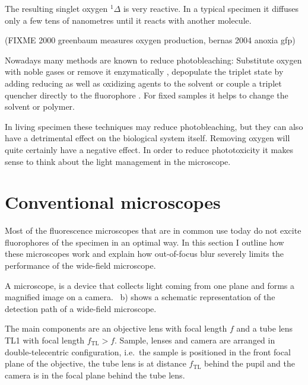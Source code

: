 The resulting singlet oxygen ${}^1\Delta$ is very reactive. In a
typical specimen it diffuses only a few tens of nanometres until it
reacts with another molecule.

(FIXME 2000 greenbaum measures oxygen production, bernas 2004 anoxia gfp)

Nowadays many methods are known to reduce photobleaching: Substitute
oxygen with noble gases or remove it enzymatically
\citep[p.~89]{Sauer2011}, depopulate the triplet state by adding
reducing as well as oxidizing agents to the solvent
\citep{Vogelsang2008} or couple a triplet quencher directly to the
fluorophore \citep[p.~19]{Sauer2011}. For fixed samples it helps to
change the solvent or polymer.
 
In living specimen these techniques may reduce photobleaching, but
they can also have a detrimental effect on the biological system
itself. Removing oxygen will quite certainly have a negative
effect. In order to reduce phototoxicity it makes sense to think about
the light management in the microscope.


\section{Conventional microscopes}
\begin{summary}
  Most of the fluorescence microscopes that are in common use today do
  not excite fluorophores of the specimen in an optimal way. In
  this section I outline how these microscopes work and explain how
  out-of-focus blur severely limits the performance of the wide-field
  microscope.
\end{summary}


A microscope, is a device that collects light coming from one plane
and forms a magnified image on a
camera. ~b) shows a schematic
representation of the detection path of a wide-field microscope.

The main components are an objective lens with focal length $f$ and a
tube lens TL1 with focal length $f_\textrm{TL}>f$. Sample, lenses and
camera are arranged in double-telecentric configuration, i.e.\ the
sample is positioned in the front focal plane of the objective, the
tube lens is at distance $f_\textrm{TL}$ behind the pupil and the
camera is in the focal plane behind the tube lens.



